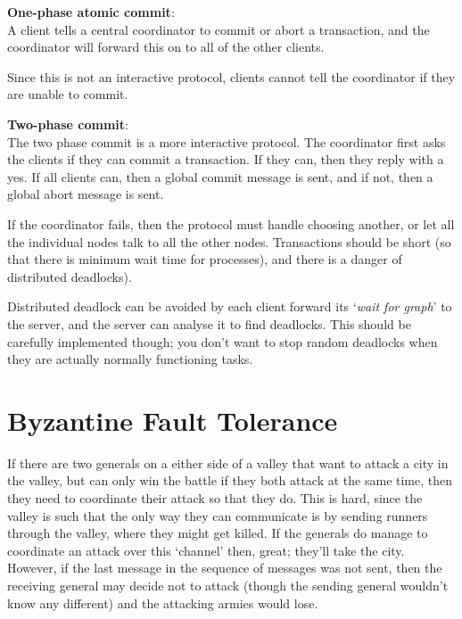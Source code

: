 \begin{description}
  \item \textbf{One-phase atomic commit}:\\
    A client tells a central coordinator to commit or abort a transaction, and
    the coordinator will forward this on to all of the other clients.

    Since this is not an interactive protocol, clients cannot tell the
    coordinator if they are unable to commit.

  \item \textbf{Two-phase commit}:\\
    The two phase commit is a more interactive protocol. The coordinator first
    asks the clients if they can commit a transaction. If they can, then they
    reply with a yes. If all clients can, then a global commit message is sent,
    and if not, then a global abort message is sent.

    If the coordinator fails, then the protocol must handle choosing another, or
    let all the individual nodes talk to all the other nodes. Transactions
    should be short (so that there is minimum wait time for processes), and
    there is a danger of distributed deadlocks).

    Distributed deadlock can be avoided by each client forward its `\textit{wait
    for graph}' to the server, and the server can analyse it to find deadlocks.
    This should be carefully implemented though; you don't want to stop random
    deadlocks when they are actually normally functioning tasks.
\end{description}

\section{Byzantine Fault Tolerance}

If there are two generals on a either side of a valley that want to attack a
city in the valley, but can only win the battle if they both attack at the same
time, then they need to coordinate their attack so that they do. This is hard,
since the valley is such that the only way they can communicate is by sending
runners through the valley, where they might get killed. If the generals do
manage to coordinate an attack over this `channel' then, great; they'll take the
city. However, if the last message in the sequence of messages was not sent,
then the receiving general may decide not to attack (though the sending general
wouldn't know any different) and the attacking armies would lose.

